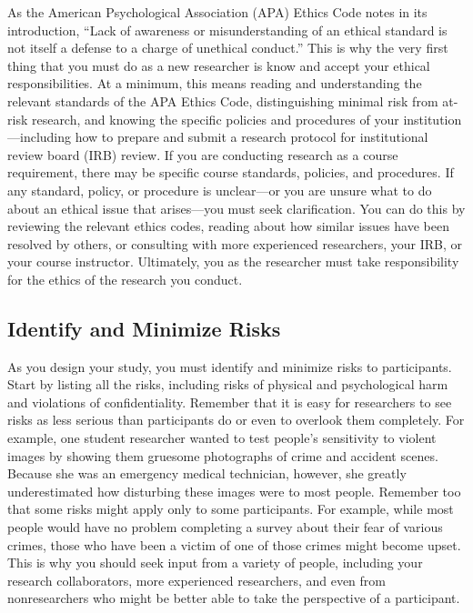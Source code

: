 \documentclass[
]{krantz}
\begin{document}
As the American Psychological Association (APA) Ethics Code notes in its introduction, ``Lack of awareness or misunderstanding of an ethical standard is not itself a defense to a charge of unethical conduct.'' This is why the very first thing that you must do as a new researcher is know and accept your ethical responsibilities. At a minimum, this means reading and understanding the relevant standards of the APA Ethics Code, distinguishing minimal risk from at-risk research, and knowing the specific policies and procedures of your institution---including how to prepare and submit a research protocol for institutional review board (IRB) review. If you are conducting research as a course requirement, there may be specific course standards, policies, and procedures. If any standard, policy, or procedure is unclear---or you are unsure what to do about an ethical issue that arises---you must seek clarification. You can do this by reviewing the relevant ethics codes, reading about how similar issues have been resolved by others, or consulting with more experienced researchers, your IRB, or your course instructor. Ultimately, you as the researcher must take responsibility for the ethics of the research you conduct.

\hypertarget{identify-and-minimize-risks}{%
\subsection*{Identify and Minimize Risks}\label{identify-and-minimize-risks}}


As you design your study, you must identify and minimize risks to participants. Start by listing all the risks, including risks of physical and psychological harm and violations of confidentiality. Remember that it is easy for researchers to see risks as less serious than participants do or even to overlook them completely. For example, one student researcher wanted to test people's sensitivity to violent images by showing them gruesome photographs of crime and accident scenes. Because she was an emergency medical technician, however, she greatly underestimated how disturbing these images were to most people. Remember too that some risks might apply only to some participants. For example, while most people would have no problem completing a survey about their fear of various crimes, those who have been a victim of one of those crimes might become upset. This is why you should seek input from a variety of people, including your research collaborators, more experienced researchers, and even from nonresearchers who might be better able to take the perspective of a participant.
\end{document}
